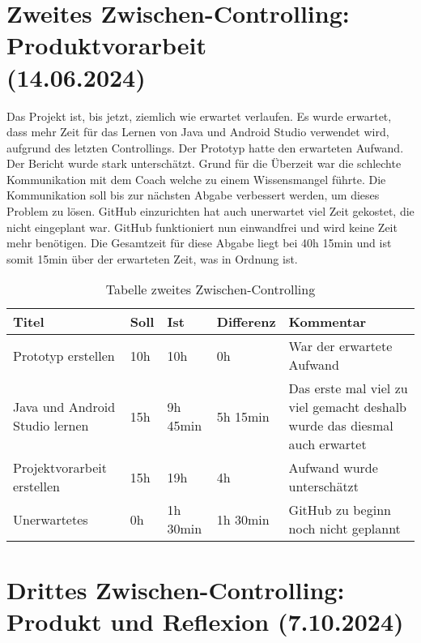 \section{Zweites Zwischen-Controlling: Produktvorarbeit \\(14.06.2024)}
Das Projekt ist, bis jetzt, ziemlich wie erwartet verlaufen. Es wurde erwartet, dass mehr Zeit für das Lernen von Java und Android Studio verwendet wird, aufgrund des letzten Controllings. Der Prototyp hatte den erwarteten Aufwand. Der Bericht wurde stark unterschätzt. Grund für die Überzeit war die schlechte Kommunikation mit dem Coach welche zu einem Wissensmangel führte. Die Kommunikation soll bis zur nächsten Abgabe verbessert werden, um dieses Problem zu lösen. GitHub einzurichten hat auch unerwartet viel Zeit gekostet, die nicht eingeplant war. GitHub funktioniert nun einwandfrei und wird keine Zeit mehr benötigen. Die Gesamtzeit für diese Abgabe liegt bei 40h 15min und ist somit 15min über der erwarteten Zeit, was in Ordnung ist.
\begin{table}[h]
    \begin{tabularx}{\textwidth}{X|X|X|X|X}
        \textbf{Titel} & \textbf{Soll} & \textbf{Ist} & \textbf{Differenz} & \textbf{Kommentar} \\ \hline
        Prototyp erstellen & 10h & 10h & 0h & War der erwartete Aufwand \\\hline
        Java und Android Studio lernen & 15h & 9h 45min & 5h 15min & Das erste mal viel zu viel gemacht deshalb wurde das diesmal auch erwartet \\\hline
        Projektvorarbeit erstellen & 15h & 19h &  4h & Aufwand wurde unterschätzt \\\hline
        Unerwartetes & 0h & 1h 30min & 1h 30min & GitHub zu beginn noch nicht geplannt \\
    \end{tabularx}
    \caption{Tabelle zweites Zwischen-Controlling}
\end{table}

\newpage
\section{Drittes Zwischen-Controlling: Produkt und Reflexion (7.10.2024)}

